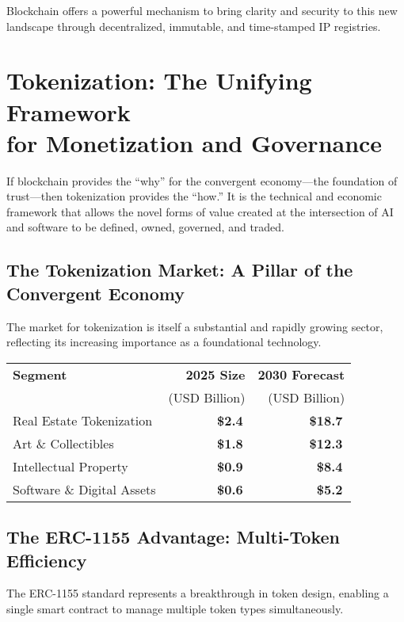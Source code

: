 \documentclass[11pt,a4paper]{report}
\newcommand{\marketvalue}[2]{\textcolor{trust}{\textbf{\$#1}}\,\textcolor{darkgray}{#2}}
\begin{document}
Blockchain offers a powerful mechanism to bring clarity and security to this new landscape through decentralized, immutable, and time-stamped IP registries.

\chapter{Tokenization: The Unifying Framework\\for Monetization and Governance}

If blockchain provides the ``why'' for the convergent economy---the foundation of trust---then tokenization provides the ``how.'' It is the technical and economic framework that allows the novel forms of value created at the intersection of AI and software to be defined, owned, governed, and traded.

\section{The Tokenization Market: A Pillar of the Convergent Economy}

The market for tokenization is itself a substantial and rapidly growing sector, reflecting its increasing importance as a foundational technology.

\begin{marketfigure}
\centering
\begin{tabular}{lrr}
\toprule
\textbf{Segment} & \textbf{2025 Size} & \textbf{2030 Forecast} \\
& (USD Billion) & (USD Billion) \\
\midrule
Real Estate Tokenization & \marketvalue{2.4}{} & \marketvalue{18.7}{} \\
Art \& Collectibles & \marketvalue{1.8}{} & \marketvalue{12.3}{} \\
Intellectual Property & \marketvalue{0.9}{} & \marketvalue{8.4}{} \\
Software \& Digital Assets & \marketvalue{0.6}{} & \marketvalue{5.2}{} \\
\bottomrule
\end{tabular}
\end{marketfigure}

\section{The ERC-1155 Advantage: Multi-Token Efficiency}

The ERC-1155 standard represents a breakthrough in token design, enabling a single smart contract to manage multiple token types simultaneously.
\end{document}
